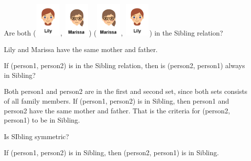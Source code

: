 \documentclass{ximera}
\begin{document}
\begin{exercise}
Are both ({\includegraphics[width=50px,height=65px]{pics/people/lily.png}}, {\includegraphics[width=50px,height=65px]{pics/people/marissa.png}}) 
({\includegraphics[width=50px,height=65px]{pics/people/marissa.png}}, {\includegraphics[width=50px,height=65px]{pics/people/lily.png}})
in the Sibling relation?

  \begin{multipleChoice}
  \end{multipleChoice}
  \begin{feedback}
Lily and Marissa have the same mother and father.
  \end{feedback}
\end{exercise}






\begin{exercise}
If (person1, person2) is in the Sibling relation, then is (person2, person1) always in Sibling?

  \begin{multipleChoice}
  \end{multipleChoice}
  \begin{feedback}
Both person1 and person2 are in the first and second set, since both sets consists of all family members. If (person1, person2) is in Sibling, then person1 and person2 have the same mother and father. That is the criteria for (person2, person1) to be in Sibling.
  \end{feedback}
\end{exercise}




\begin{exercise}
Is SIbling symmetric?

  \begin{multipleChoice}
  \end{multipleChoice}
  \begin{feedback}
If (person1, person2) is in Sibling, then (person2, person1) is in Sibling.
  \end{feedback}
\end{exercise}
\end{document}
